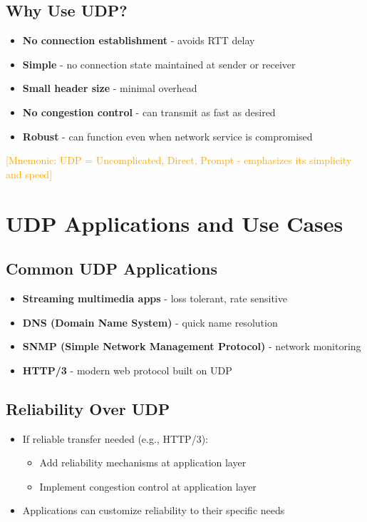 \documentclass[12pt]{article}
\begin{document}
\subsection{Why Use UDP?}
\begin{itemize}
    \item \textbf{No connection establishment} - avoids RTT delay
    \item \textbf{Simple} - no connection state maintained at sender or receiver
    \item \textbf{Small header size} - minimal overhead
    \item \textbf{No congestion control} - can transmit as fast as desired
    \item \textbf{Robust} - can function even when network service is compromised
\end{itemize}

\textcolor{orange}{[Mnemonic: UDP = Uncomplicated, Direct, Prompt - emphasizes its simplicity and speed]}

\section{UDP Applications and Use Cases}

\subsection{Common UDP Applications}
\begin{itemize}
    \item \textbf{Streaming multimedia apps} - loss tolerant, rate sensitive
    \item \textbf{DNS (Domain Name System)} - quick name resolution
    \item \textbf{SNMP (Simple Network Management Protocol)} - network monitoring
    \item \textbf{HTTP/3} - modern web protocol built on UDP
\end{itemize}

\subsection{Reliability Over UDP}
\begin{itemize}
    \item If reliable transfer needed (e.g., HTTP/3):
          \begin{itemize}
              \item Add reliability mechanisms at application layer
              \item Implement congestion control at application layer
          \end{itemize}
    \item Applications can customize reliability to their specific needs
\end{itemize}
\end{document}

